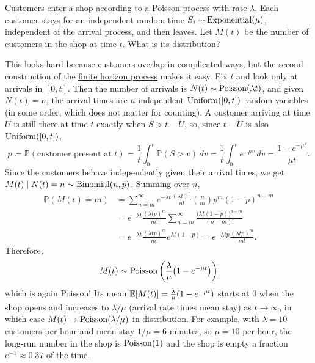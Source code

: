 	\begin{example}
	  Customers enter a shop according to a Poisson process with rate $\lambda$. Each customer stays for an independent random time $S_i \sim \operatorname{Exponential}(\mu)$, independent of the arrival process, and then leaves. Let $M(t)$ be the number of customers in the shop at time $t$. What is its distribution? 

	  This looks hard because customers overlap in complicated ways, but the second construction of the \hyperref[def:poisson-process]{finite horizon process} makes it easy. Fix $t$ and look only at arrivals in $[0, t]$. Then the number of arrivals is $N(t) \sim \operatorname{Poisson}(\lambda t)$, and given $N(t) = n$, the arrival times are $n$ independent $\operatorname{Uniform}([0, t])$ random variables (in some order, which does not matter for counting). A customer arriving at time $U$ is still there at time $t$ exactly when $S > t - U$, so, since $t - U$ is also $\operatorname{Uniform}([0, t])$, 
	  \begin{equation}
	    p \coloneqq \mathbb{P}(\text{customer present at } t) = \frac{1}{t} \int_0^t \mathbb{P}(S > v) \, dv = \frac{1}{t} \int_0^t e^{-\mu v} \, dv = \frac{1 - e^{-\mu t}}{\mu t}. 
	  \end{equation}
	  Since the customers behave independently given their arrival times, we get $M(t) \mid N(t) = n \sim \operatorname{Binomial}(n, p)$. Summing over $n$, 
	  \begin{align}
	    \mathbb{P}(M(t) = m) & = \sum_{n = m}^\infty e^{-\lambda t} \frac{(\lambda t)^n}{n!} \binom{n}{m} p^m (1 - p)^{n - m} \\ 
	    & = e^{-\lambda t} \frac{(\lambda t p)^m}{m!} \sum_{n = m}^\infty \frac{\big(\lambda t (1 - p)\big)^{n - m}}{(n - m)!} \\ 
	    & = e^{-\lambda t} \frac{(\lambda t p)^m}{m!} e^{\lambda t (1 - p)} = e^{-\lambda t p} \frac{(\lambda t p)^m}{m!}.
	  \end{align}
	  Therefore, 
	  \begin{equation}
	    M(t) \sim \operatorname{Poisson}\bigg( \frac{\lambda}{\mu} \big(1 - e^{-\mu t}\big) \bigg)
	  \end{equation}
	  which is again Poisson! Its mean $\operatorname{\mathbb{E}}[M(t)] = \frac{\lambda}{\mu}(1 - e^{-\mu t})$ starts at $0$ when the shop opens and increases to $\lambda / \mu$ (arrival rate times mean stay) as $t \to \infty$, in which case $M(t) \to \operatorname{Poisson}(\lambda/\mu)$ in distribution. For example, with $\lambda = 10$ customers per hour and mean stay $1/\mu = 6$ minutes, so $\mu = 10$ per hour, the long-run number in the shop is $\operatorname{Poisson}(1)$ and the shop is empty a fraction $e^{-1} \approx 0.37$ of the time. 
	\end{example}
